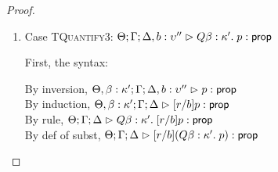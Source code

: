 \begin{proof}
\begin{enumerate}
  For semantics, consider
  $\interp{\judgeA[\Theta; \Gamma; \Delta]
                  {[r/b](Q x:A.\;p)}{\assert}}\;\theta\;\gamma\;\delta$ 
  \begin{eqnproof}
          {Semantics}
          {Induction}
          {Semantics}
  \end{eqnproof}
  Here, we make use of the fact that $x$ is not free in $e''$, and we silently permute the context as 
  needed. 

\item Case \textsc{TQuantify3}: $\judgeA[\Theta; \Gamma; \Delta, b:\upsilon'']{Q \beta:\kappa'.\;p}{\assert}$
  
  First, the syntax:
  \begin{tabbedproof}
    \oo By inversion, $\judgeA[\Theta, \beta:\kappa'; \Gamma; \Delta, b:\upsilon'']{p}{\assert}$ \\
    \oo By induction, $\judgeA[\Theta, \beta:\kappa'; \Gamma; \Delta]{[r/b]p}{\assert}$ \\
    \oo By rule, $\judgeA[\Theta; \Gamma; \Delta]
                         {Q \beta:\kappa'.\;[r/b]p}{\assert}$ \\
    \oo By def of subst, $\judgeA[\Theta; \Gamma; \Delta]
                                 {[r/b](Q \beta:\kappa'.\;p)}{\assert}$ 
  \end{tabbedproof}


\end{enumerate}
\end{proof}
